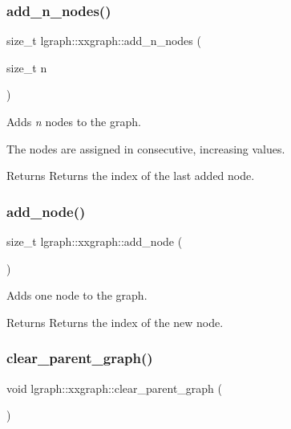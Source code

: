 \subsubsection{\texorpdfstring{add\+\_\+n\+\_\+nodes()}{add\_n\_nodes()}}
{\footnotesize\ttfamily size\+\_\+t lgraph\+::xxgraph\+::add\+\_\+n\+\_\+nodes (\begin{DoxyParamCaption}\item[{size\+\_\+t}]{n }\end{DoxyParamCaption})}



Adds {\itshape n} nodes to the graph. 

The nodes are assigned in consecutive, increasing values. \begin{DoxyReturn}{Returns}
Returns the index of the last added node. 
\end{DoxyReturn}
\mbox{\label{classlgraph_1_1xxgraph_a6cb21d5e52afbb438a3e6643998c40cf}} 
\subsubsection{\texorpdfstring{add\+\_\+node()}{add\_node()}}
{\footnotesize\ttfamily size\+\_\+t lgraph\+::xxgraph\+::add\+\_\+node (\begin{DoxyParamCaption}{ }\end{DoxyParamCaption})}



Adds one node to the graph. 

\begin{DoxyReturn}{Returns}
Returns the index of the new node. 
\end{DoxyReturn}
\mbox{\label{classlgraph_1_1xxgraph_a4122495066e4402cbf6d2d9bb82d54cc}} 
\subsubsection{\texorpdfstring{clear\+\_\+parent\+\_\+graph()}{clear\_parent\_graph()}}
{\footnotesize\ttfamily void lgraph\+::xxgraph\+::clear\+\_\+parent\+\_\+graph (\begin{DoxyParamCaption}{ }\end{DoxyParamCaption})\hspace{0.3cm}{\ttfamily [protected]}}



